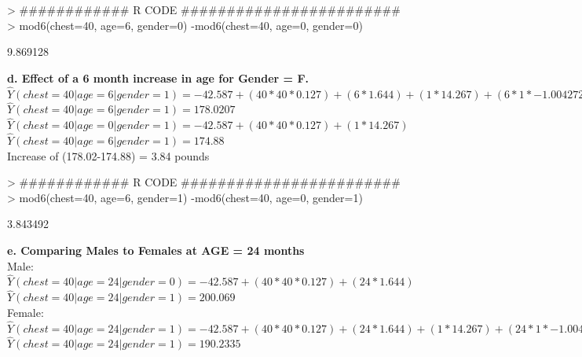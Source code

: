 \documentclass{article}
\begin{document}
\begin{Schunk}
\begin{Sinput}
> ############ R CODE ########################
> mod6(chest=40, age=6, gender=0) -mod6(chest=40, age=0, gender=0)
\end{Sinput}
\begin{Soutput}
[1] 9.869128
\end{Soutput}
\end{Schunk}


\noindent \textbf{d. Effect of a 6 month increase in age for Gender = F.} \\
\noindent $\hat{Y}(chest=40|age=6|gender=1) = -42.587 + (40*40*0.127) + (6*1.644) + (1*14.267) + (6*1*-1.00427258)$ \\ 
$\hat{Y}(chest=40|age=6|gender=1) = 178.0207 $ \\ 

\noindent $\hat{Y}(chest=40|age=0|gender=1) = -42.587 + (40*40*0.127) + (1*14.267) $ \\ 
$\hat{Y}(chest=40|age=6|gender=1) = 174.88 $ \\ 

\noindent Increase of (178.02-174.88) = 3.84 pounds \\


\begin{Schunk}
\begin{Sinput}
> ############ R CODE ########################
> mod6(chest=40, age=6, gender=1) -mod6(chest=40, age=0, gender=1)
\end{Sinput}
\begin{Soutput}
[1] 3.843492
\end{Soutput}
\end{Schunk}


\noindent \textbf{e. Comparing Males to Females at AGE = 24 months} \\

\noindent Male: $\hat{Y}(chest=40|age=24|gender=0) = -42.587 + (40*40*0.127) + (24*1.644)$ \\ 
$\hat{Y}(chest=40|age=24|gender=1) = 200.069 $ \\ 

\noindent Female: $\hat{Y}(chest=40|age=24|gender=1) = -42.587 + (40*40*0.127) + (24*1.644) + (1*14.267) + (24*1*-1.00427258)$ \\ 
$\hat{Y}(chest=40|age=24|gender=1) = 190.2335 $ \\ 
\end{document}
